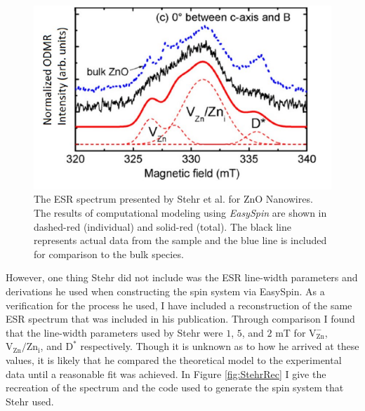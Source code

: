\documentclass[oneside, astronomy, noacknowlegments]{BYUPhys}
\begin{document}
\begin{figure}
    \centerline{\includegraphics{stehr_fig}}
    \caption[ESR Spectrum Presented by Stehr et al.]{\label{fig:StehrPlots}
     The ESR spectrum presented by Stehr et al. for ZnO Nanowires. The results of computational modeling using \textit{EasySpin} are shown in dashed-red (individual) and solid-red (total). The black line represents actual data from the sample and the blue line is included for comparison to the bulk species.}
 \end{figure}

However, one thing Stehr did not include was the ESR line-width parameters and derivations he used when constructing the spin system via EasySpin. As a verification for the process he used, I have included a reconstruction of the same ESR spectrum that was included in his publication. Through comparison I found that the line-width parameters used by Stehr were $1$, $5$, and $2$ mT for 
$\text{V}_{\text{Zn}}^{-}$, $\text{V}_{\text{Zn}}/\text{Zn}_{\text{i}}$, and $\text{D}^{*}$ respectively. Though it is unknown as to how he arrived at these values, it is likely that he compared the theoretical model to the experimental data until a reasonable fit was achieved. In Figure \ref{fig:StehrRec} I give the recreation of the spectrum and the code used to generate the spin system that Stehr used.
\end{document}
